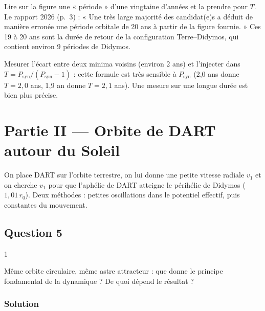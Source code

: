 \documentclass[11pt,a4paper]{article}
\begin{document}
\begin{piege}

Lire sur la figure une « période » d'une vingtaine d'années et la prendre pour \(T\). Le rapport 2026 (p.~3) : « Une très large majorité des candidat(e)s a déduit de manière erronée une période orbitale de 20 ans à partir de la figure fournie. » Ces 19 à 20 ans sont la durée de retour de la configuration Terre--Didymos, qui contient environ 9 périodes de Didymos.

\end{piege}

\begin{piege}

Mesurer l'écart entre deux minima voisins (environ 2 ans) et l'injecter dans \(T=P_{\text{syn}}/(P_{\text{syn}}-1)\) : cette formule est très sensible à \(P_{\text{syn}}\) (2,0 ans donne \(T=2{,}0\) ans, 1,9 an donne \(T=2{,}1\) ans). Une mesure sur une longue durée est bien plus précise.

\end{piege}

\hypertarget{partie-ii-orbite-de-dart-autour-du-soleil}{%
\section{Partie II --- Orbite de DART autour du Soleil}\label{partie-ii-orbite-de-dart-autour-du-soleil}}

On place DART sur l'orbite terrestre, on lui donne une petite vitesse radiale \(v_1\) et on cherche \(v_1\) pour que l'aphélie de DART atteigne le périhélie de Didymos (\(1{,}01\,r_0\)). Deux méthodes : petites oscillations dans le potentiel effectif, puis constantes du mouvement.

\hypertarget{question-5}{%
\subsection{Question 5}\label{question-5}}

\begin{indication}{1}

Même orbite circulaire, même astre attracteur : que donne le principe fondamental de la dynamique ? De quoi dépend le résultat ?

\end{indication}

\hypertarget{solution-4}{%
\subsubsection{Solution}\label{solution-4}}
\end{document}
